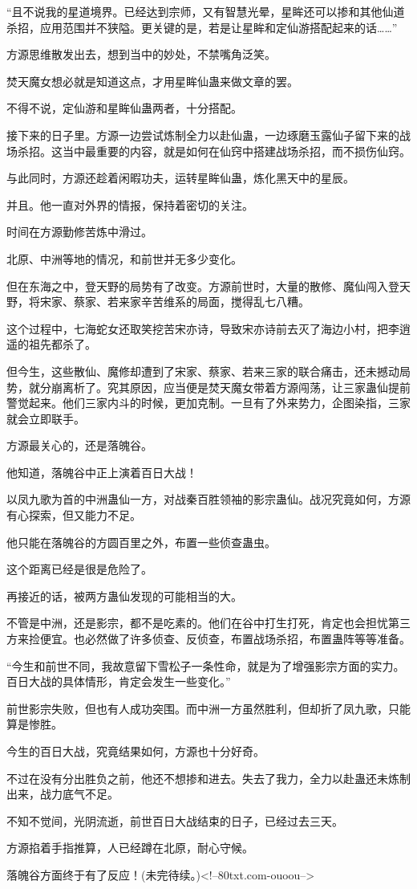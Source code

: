\begin{this_body}
“且不说我的星道境界。已经达到宗师，又有智慧光晕，星眸还可以掺和其他仙道杀招，应用范围并不狭隘。更关键的是，若是让星眸和定仙游搭配起来的话……”

方源思维散发出去，想到当中的妙处，不禁嘴角泛笑。

焚天魔女想必就是知道这点，才用星眸仙蛊来做文章的罢。

不得不说，定仙游和星眸仙蛊两者，十分搭配。

接下来的日子里。方源一边尝试炼制全力以赴仙蛊，一边琢磨玉露仙子留下来的战场杀招。这当中最重要的内容，就是如何在仙窍中搭建战场杀招，而不损伤仙窍。

与此同时，方源还趁着闲暇功夫，运转星眸仙蛊，炼化黑天中的星辰。

并且。他一直对外界的情报，保持着密切的关注。

时间在方源勤修苦炼中滑过。

北原、中洲等地的情况，和前世并无多少变化。

但在东海之中，登天野的局势有了改变。方源前世时，大量的散修、魔仙闯入登天野，将宋家、蔡家、若来家辛苦维系的局面，搅得乱七八糟。

这个过程中，七海蛇女还取笑挖苦宋亦诗，导致宋亦诗前去灭了海边小村，把李逍遥的祖先都杀了。

但今生，这些散仙、魔修却遭到了宋家、蔡家、若来三家的联合痛击，还未撼动局势，就分崩离析了。究其原因，应当便是焚天魔女带着方源闯荡，让三家蛊仙提前警觉起来。他们三家内斗的时候，更加克制。一旦有了外来势力，企图染指，三家就会立即联手。

方源最关心的，还是落魄谷。

他知道，落魄谷中正上演着百日大战！

以凤九歌为首的中洲蛊仙一方，对战秦百胜领袖的影宗蛊仙。战况究竟如何，方源有心探索，但又能力不足。

他只能在落魄谷的方圆百里之外，布置一些侦查蛊虫。

这个距离已经是很是危险了。

再接近的话，被两方蛊仙发现的可能相当的大。

不管是中洲，还是影宗，都不是吃素的。他们在谷中打生打死，肯定也会担忧第三方来捡便宜。也必然做了许多侦查、反侦查，布置战场杀招，布置蛊阵等等准备。

“今生和前世不同，我故意留下雪松子一条性命，就是为了增强影宗方面的实力。百日大战的具体情形，肯定会发生一些变化。”

前世影宗失败，但也有人成功突围。而中洲一方虽然胜利，但却折了凤九歌，只能算是惨胜。

今生的百日大战，究竟结果如何，方源也十分好奇。

不过在没有分出胜负之前，他还不想掺和进去。失去了我力，全力以赴蛊还未炼制出来，战力底气不足。

不知不觉间，光阴流逝，前世百日大战结束的日子，已经过去三天。

方源掐着手指推算，人已经蹲在北原，耐心守候。

落魄谷方面终于有了反应！(未完待续。)<!--80txt.com-ouoou-->

\end{this_body}

